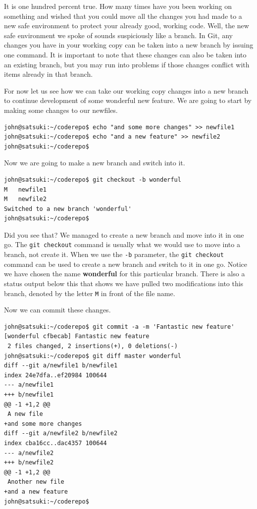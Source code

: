 It is one hundred percent true.  How many times have you been working on something and wished that you could move all the changes you had made to a new safe environment to protect your already good, working code.  Well, the new safe environment we spoke of sounds suspiciously like a branch.  In Git, any changes you have in your working copy can be taken into a new branch by issuing one command.  It is important to note that these changes can also be taken into an existing branch, but you may run into problems if those changes conflict with items already in that branch.

For now let us see how we can take our working copy changes into a new branch to continue development of some wonderful new feature.  We are going to start by making some changes to our newfiles.

\begin{Verbatim}
john@satsuki:~/coderepo$ echo "and some more changes" >> newfile1
john@satsuki:~/coderepo$ echo "and a new feature" >> newfile2
john@satsuki:~/coderepo$ 
\end{Verbatim}

Now we are going to make a new branch and switch into it.

\begin{Verbatim}
john@satsuki:~/coderepo$ git checkout -b wonderful
M	newfile1
M	newfile2
Switched to a new branch 'wonderful'
john@satsuki:~/coderepo$ 
\end{Verbatim}

Did you see that?  We managed to create a new branch and move into it in one go.  The \texttt{git checkout} command is usually what we would use to move into a branch, not create it.  When we use the \texttt{-b} parameter, the \texttt{git checkout} command can be used to create a new branch and switch to it in one go.  Notice we have chosen the name \textbf{wonderful} for this particular branch.  There is also a status output below this that shows we have pulled two modifications into this branch, denoted by the letter \texttt{M} in front of the file name.

Now we can commit these changes.

\begin{Verbatim}
john@satsuki:~/coderepo$ git commit -a -m 'Fantastic new feature'
[wonderful cfbecab] Fantastic new feature
 2 files changed, 2 insertions(+), 0 deletions(-)
john@satsuki:~/coderepo$ git diff master wonderful 
diff --git a/newfile1 b/newfile1
index 24e7dfa..ef20984 100644
--- a/newfile1
+++ b/newfile1
@@ -1 +1,2 @@
 A new file
+and some more changes
diff --git a/newfile2 b/newfile2
index cba16cc..dac4357 100644
--- a/newfile2
+++ b/newfile2
@@ -1 +1,2 @@
 Another new file
+and a new feature
john@satsuki:~/coderepo$ 
\end{Verbatim}

